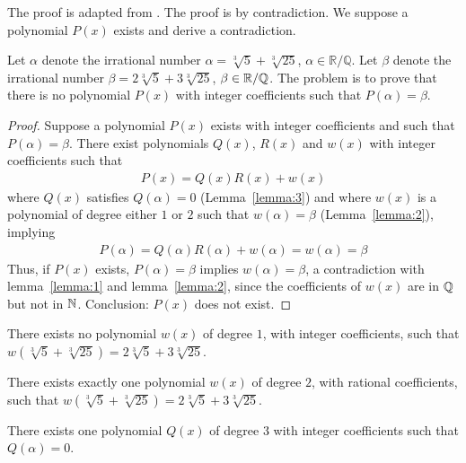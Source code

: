 
The proof is adapted from \cite{j23:2013}. The proof is by contradiction. We suppose a polynomial $P(x)$ exists and derive a contradiction.

Let $\alpha$ denote the irrational number $\alpha=\sqrt[3]{5}+\sqrt[3]{25}$, $\alpha\in\mathbb{R}/\mathbb{Q}$. Let $\beta$ denote the irrational number $\beta=2\sqrt[3]{5}+3\sqrt[3]{25}$, $\beta\in\mathbb{R}/\mathbb{Q}$. 
The problem is to prove that there is no polynomial $P(x)$ with integer coeﬀicients such that $P(\alpha)=\beta$.

\begin{proof}
Suppose a polynomial $P(x)$ exists with integer coefficients and such that $P(\alpha)=\beta$. There exist polynomials $Q(x)$, $R(x)$ and $w(x)$ with integer coefficients such that 
\begin{align*}
P(x) = Q(x) R(x) + w(x)
\end{align*}
where $Q(x)$ satisfies $Q(\alpha)=0$ (Lemma~\ref{lemma:3}) and where $w(x)$ is a polynomial of degree either $1$ or $2$ such that $w(\alpha)=\beta$ (Lemma~\ref{lemma:2}), implying
\begin{align*}
P(\alpha) 
= Q(\alpha) R(\alpha) + w(\alpha) 
= w(\alpha)
= \beta
\end{align*}
Thus, if $P(x)$ exists, $P(\alpha)=\beta$ implies $w(\alpha)=\beta$, a contradiction with lemma~\ref{lemma:1} and lemma~\ref{lemma:2}, since the coefficients of $w(x)$ are in $\mathbb{Q}$ but not in $\mathbb{N}$. Conclusion: $P(x)$ does not exist.
\end{proof}

\setcounter{lemma}{0}
\begin{lemma}\label{lemma:1}
There exists no polynomial $w(x)$ of degree $1$, with integer coefficients, such that $w(\sqrt[3]{5}+\sqrt[3]{25})=2\sqrt[3]{5}+3\sqrt[3]{25}$.
\end{lemma}

\begin{lemma}\label{lemma:2}
There exists exactly one polynomial $w(x)$ of degree $2$, with rational coefficients, such that $w(\sqrt[3]{5}+\sqrt[3]{25})=2\sqrt[3]{5}+3\sqrt[3]{25}$.
\end{lemma}

\begin{lemma}\label{lemma:3}
There exists one polynomial $Q(x)$ of degree $3$ with integer coefficients such that $Q(\alpha)=0$.
\end{lemma}

